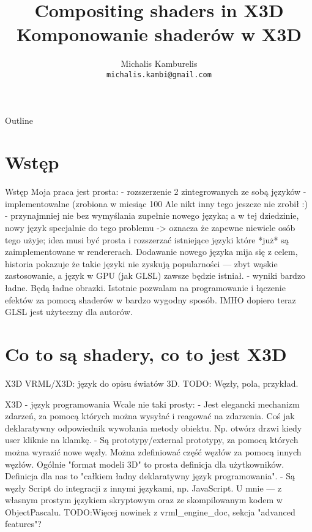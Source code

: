 \documentclass{beamer}
\title{Compositing shaders in X3D\\
Komponowanie shaderów w X3D}
\author[Michalis Kamburelis]{Michalis Kamburelis \\ \texttt{michalis.kambi@gmail.com}}
\begin{document}
\begin{frame}
  \titlepage
\end{frame}

\begin{frame}{Outline}
  \tableofcontents
\end{frame}

\section{Wstęp}

\begin{frame}{Wstęp}
Moja praca jest prosta:
  - rozszerzenie 2 zintegrowanych ze sobą języków
  - implementowalne (zrobiona w miesiąc 100%
  Ale nikt inny tego jeszcze nie zrobił :)
  - przynajmniej nie bez wymyślania zupełnie nowego języka; a w tej dziedzinie, nowy język specjalnie do tego problemu -> oznacza że zapewne niewiele osób tego użyje; idea musi być prosta i rozszerzać istniejące języki które *już* są zaimplementowane w rendererach. Dodawanie nowego języka mija się z celem, historia pokazuje że takie języki nie zyskują popularności --- zbyt wąskie zastosowanie, a język w GPU (jak GLSL) zawsze będzie istniał.
  - wyniki bardzo ładne. Będą ładne obrazki.
    Istotnie pozwalam na programowanie i łączenie efektów za pomocą shaderów w bardzo wygodny sposób.
    IMHO dopiero teraz GLSL jest użyteczny dla autorów.
\end{frame}

\section{Co to są shadery, co to jest X3D}

\begin{frame}{X3D}
  VRML/X3D: język do opisu światów 3D.
  TODO: Węzły, pola, przykład.
\end{frame}

\begin{frame}{X3D - język programowania}
Wcale nie taki prosty:
- Jest elegancki mechanizm zdarzeń, za pomocą których można wysyłać i reagować na zdarzenia. Coś jak deklaratywny odpowiednik wywołania metody obiektu. Np. otwórz drzwi kiedy user kliknie na klamkę.
- Są prototypy/external prototypy, za pomocą których można wyrazić nowe węzły. Można zdefiniować część węzłów za pomocą innych węzłów.
Ogólnie "format modeli 3D" to prosta definicja dla użytkowników. Definicja dla nas to "całkiem ładny deklaratywny język programowania".
- Są węzły Script do integracji z innymi językami, np. JavaScript. U mnie --- z własnym prostym językiem skryptowym oraz ze skompilowanym kodem w ObjectPascalu.
TODO:Więcej nowinek z vrml\_engine\_doc, sekcja "advanced features"?
\end{frame}
\end{document}
